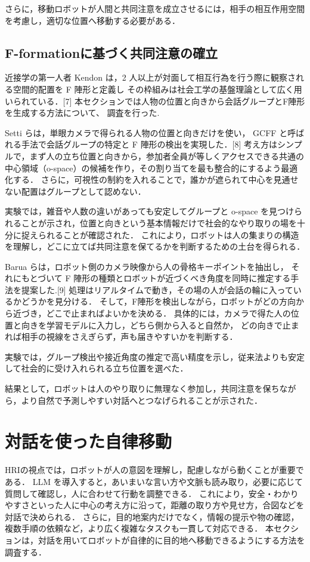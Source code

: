 \documentclass[dvipdfmx]{jarticle}
\begin{document}
 さらに，移動ロボットが人間と共同注意を成立させるには，相手の相互作用空間を考慮し，適切な位置へ移動する必要がある．
\subsection{F-formationに基づく共同注意の確立}
 近接学の第一人者 Kendon は，2 人以上が対面して相互行為を行う際に観察される空間的配置を F 陣形と定義し
 その枠組みは社会工学の基盤理論として広く用いられている．[7] 本セクションでは人物の位置と向きから会話グループとF陣形を生成する方法について、
 調査を行った.
 
 Setti らは，単眼カメラで得られる人物の位置と向きだけを使い，
 GCFF と呼ばれる手法で会話グループの特定と F 陣形の検出を実現した．[8]
 考え方はシンプルで，まず人の立ち位置と向きから，参加者全員が等しくアクセスできる共通の中心領域（o-space）の候補を作り，その割り当てを最も整合的にするよう最適化する．
 さらに，可視性の制約を入れることで，誰かが遮られて中心を見通せない配置はグループとして認めない．
 
 実験では，雑音や人数の違いがあっても安定してグループと o-space を見つけられることが示され，位置と向きという基本情報だけで社会的なやり取りの場を十分に捉えられることが確認された．
 これにより，ロボットは人の集まりの構造を理解し，どこに立てば共同注意を保てるかを判断するための土台を得られる．
 
 Barua らは，ロボット側のカメラ映像から人の骨格キーポイントを抽出し，
 それにもとづいて F 陣形の種類とロボットが近づくべき角度を同時に推定する手法を提案した.[9]
 処理はリアルタイムで動き，その場の人が会話の輪に入っているかどうかを見分ける．
 そして，F陣形を検出しながら，ロボットがどの方向から近づき，どこで止まればよいかを決める．
 具体的には，カメラで得た人の位置と向きを学習モデルに入力し，どちら側から入ると自然か，
 どの向きで止まれば相手の視線をさえぎらず，声も届きやすいかを判断する．
 
 実験では，グループ検出や接近角度の推定で高い精度を示し，従来法よりも安定して社会的に受け入れられる立ち位置を選べた．
 
 結果として，ロボットは人のやり取りに無理なく参加し，共同注意を保ちながら，より自然で予測しやすい対話へとつなげられることが示された．
 
\section{対話を使った自律移動}
 HRIの視点では，ロボットが人の意図を理解し，配慮しながら動くことが重要である．
 LLM を導入すると，あいまいな言い方や文脈も読み取り，必要に応じて質問して確認し，人に合わせて行動を調整できる．
 これにより，安全・わかりやすさといった人に中心の考え方に沿って，距離の取り方や見せ方，合図などを対話で決められる．
 さらに，目的地案内だけでなく，情報の提示や物の確認，複数手順の依頼など，より広く複雑なタスクも一貫して対応できる．
 本セクションは，対話を用いてロボットが自律的に目的地へ移動できるようにする方法を調査する．
\end{document}
